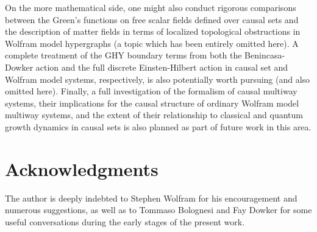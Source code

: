 \documentclass{article}
\begin{document}
On the more mathematical side, one might also conduct rigorous comparisons between the Green's functions on free scalar fields defined over causal sets and the description of matter fields in terms of localized topological obstructions in Wolfram model hypergraphs (a topic which has been entirely omitted here). A complete treatment of the GHY boundary terms from both the Benincasa-Dowker action and the full discrete Einsten-Hilbert action in causal set and Wolfram model systems, respectively, is also potentially worth pursuing (and also omitted here). Finally, a full investigation of the formalism of causal multiway systems, their implications for the causal structure of ordinary Wolfram model multiway systems, and the extent of their relationship to classical and quantum growth dynamics in causal sets is also planned as part of future work in this area.

\section*{Acknowledgments}

The author is deeply indebted to Stephen Wolfram for his encouragement and numerous suggestions, as well as to Tommaso Bolognesi and Fay Dowker for some useful conversations during the early stages of the present work.
\end{document}
